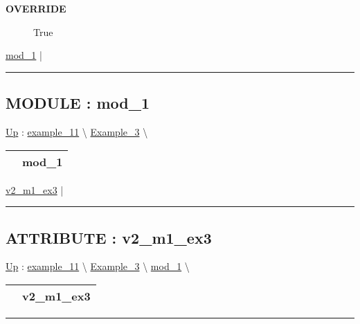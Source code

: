 \par

\par
\begin{description}
\item [\textbf{OVERRIDE}] True
\end{description}

\hyperlink{ecldoc:Inintest.Example_3.mod_1}{mod\_1}  |

\rule{\linewidth}{0.5pt}

\subsection*{MODULE : mod\_1}
\hypertarget{ecldoc:Inintest.Example_3.mod_1}{}
\hyperlink{ecldoc:Inintest.Example_3}{Up} :
\hspace{0pt} \hyperlink{ecldoc:example_11}{example_11} \textbackslash 
\hspace{0pt} \hyperlink{ecldoc:Inintest.Example_3}{Example_3} \textbackslash 

{\renewcommand{\arraystretch}{1.5}
\begin{tabularx}{\textwidth}{|>{\raggedright\arraybackslash}l|X|}
\hline
\hspace{0pt} & mod\_1 \\
\hline
\end{tabularx}
}

\par


\hyperlink{ecldoc:inintest.example_3.mod_1.v2_m1_ex3}{v2\_m1\_ex3}  |

\rule{\linewidth}{0.5pt}

\subsection*{ATTRIBUTE : v2\_m1\_ex3}
\hypertarget{ecldoc:inintest.example_3.mod_1.v2_m1_ex3}{}
\hyperlink{ecldoc:Inintest.Example_3.mod_1}{Up} :
\hspace{0pt} \hyperlink{ecldoc:example_11}{example_11} \textbackslash 
\hspace{0pt} \hyperlink{ecldoc:Inintest.Example_3}{Example_3} \textbackslash 
\hspace{0pt} \hyperlink{ecldoc:Inintest.Example_3.mod_1}{mod_1} \textbackslash 

{\renewcommand{\arraystretch}{1.5}
\begin{tabularx}{\textwidth}{|>{\raggedright\arraybackslash}l|X|}
\hline
\hspace{0pt} & v2\_m1\_ex3 \\
\hline
\end{tabularx}
}

\par


\rule{\linewidth}{0.5pt}






